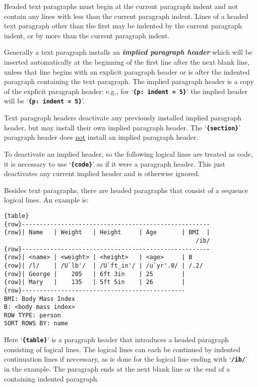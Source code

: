 \documentclass[12pt]{article}
\newcommand{\TT}[1]{{\tt \bfseries #1}}
\newcommand{\lkey}[2]{{\bf \em #1 #2}\index{#1!#2}}
\newenvironment{indpar}[1][0.3in]%
	{\begin{list}{}%
		     {\setlength{\itemsep}{0in}%
		      \setlength{\topsep}{0in}%
		      \setlength{\parsep}{1ex}%
		      \setlength{\labelwidth}{#1}%
		      \setlength{\leftmargin}{#1}%
		      \addtolength{\leftmargin}{\labelsep}}%
	 \item}%
	{\end{list}}
\begin{document}
Headed text paragraphs must begin at the current paragraph indent
and not contain any lines with less than the current paragraph indent.
Lines of a headed text paragraph other than the first may be indented
by the current paragraph indent, or by more than the current paragraph
indent.

Generally a text paragraph installs an \lkey{implied paragraph}{header}
which will be inserted automatically at the beginning of the first
line after the next blank line, unless that line begins with an
explicit paragraph header or is after the indented paragraph containing
the text paragraph.  The implied
paragraph header is a copy of the explicit paragraph header:
e.g., for `\TT{\{p:~indent = 5\}}' the implied header will
be `\TT{\{p:~indent = 5\}}'.

Text paragraph headers deactivate any previously installed implied
paragraph header, but may install their own implied paragraph header.
The `\TT{\{section\}}' paragraph
header does \underline{not} install an implied paragraph header.

To deactivate an implied header, so the following logical lines
are treated as code, it is necessary
to use `\TT{\{code\}}' as if it were a paragraph header.
This just deactivates any current implied header
and is otherwise ignored.

Besides text paragraphs, there are headed paragraphs that consist
of a sequence logical lines.  An example is:
\begin{indpar}\begin{verbatim}
{table}
{row}-----------------------------------------------------
{row}| Name   | Weight   | Height     | Age       | BMI  |
                                                      /ib/
{row}-----------------------------------------------------
{row}| <name> | <weight> | <height>   | <age>     | B
{row}| /l/    | /U`lb'/  | /U`ft_in'/ | /u`yr'.0/ | /.2/
{row}| George |    205   | 6ft 3in    | 25        |
{row}| Mary   |    135   | 5ft 5in    | 26        |
{row}----------------------------------------------
BMI: Body Mass Index
B: <body mass index>
ROW TYPE: person
SORT ROWS BY: name
\end{verbatim}\end{indpar}

Here `\TT{\{table\}}'\label{TABLE-PARAGRAPH}
is a paragraph header that introduces
a headed paragraph consisting of logical lines.  The logical
lines can each be continued by indented continuation lines
if neccessary, as is done for the logical line ending with
`\TT{/ib/}' in the example.  The paragraph ends at the next blank line
or the end of a containing indented paragraph.
\end{document}
